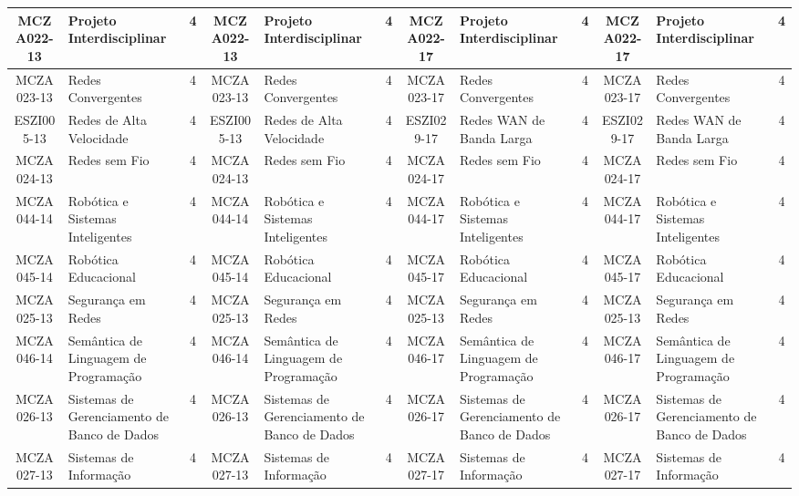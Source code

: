 \documentclass[a4paper]{article}
\begin{document}
\begin{landscape}
{\begin{longtable}{|c|p{.2\textheight}|c||c|p{.2\textheight}|c||c|p{.2\textheight}|c||c|p{.2\textheight}|c|}
MCZA022-13 & Projeto Interdisciplinar & 4 &
MCZA022-13 & Projeto Interdisciplinar & 4 &
MCZA022-17 & Projeto Interdisciplinar & 4 & 
MCZA022-17 & Projeto Interdisciplinar & 4\\ \hline

MCZA023-13 & Redes Convergentes & 4 &
MCZA023-13 & Redes Convergentes & 4 &
MCZA023-17 & Redes Convergentes & 4 &
MCZA023-17 & Redes Convergentes & 4\\ \hline

ESZI005-13 & Redes de Alta Velocidade & 4 &
ESZI005-13 & Redes de Alta Velocidade & 4 &
ESZI029-17 & Redes WAN de Banda Larga & 4 &
ESZI029-17 & Redes WAN de Banda Larga & 4\\ \hline

MCZA024-13 & Redes sem Fio & 4 &
MCZA024-13 & Redes sem Fio & 4 &
MCZA024-17 & Redes sem Fio & 4 &
MCZA024-17 & Redes sem Fio & 4\\ \hline

MCZA044-14 & Robótica e Sistemas Inteligentes & 4 &
MCZA044-14 & Robótica e Sistemas Inteligentes & 4 &
MCZA044-17 & Robótica e Sistemas Inteligentes & 4 &
MCZA044-17 & Robótica e Sistemas Inteligentes & 4\\ \hline

MCZA045-14 & Robótica Educacional & 4 &
MCZA045-14 & Robótica Educacional & 4 &
MCZA045-17 & Robótica Educacional & 4 &
MCZA045-17 & Robótica Educacional & 4\\ \hline

MCZA025-13 & Segurança em Redes & 4 &
MCZA025-13 & Segurança em Redes & 4 &
MCZA025-13 & Segurança em Redes & 4 & 
MCZA025-13 & Segurança em Redes & 4\\ \hline

MCZA046-14 & Semântica de Linguagem de Programação & 4 &
MCZA046-14 & Semântica de Linguagem de Programação & 4 &
MCZA046-17 & Semântica de Linguagem de Programação & 4 &
MCZA046-17 & Semântica de Linguagem de Programação & 4\\ \hline

MCZA026-13 & Sistemas de Gerenciamento de Banco de Dados & 4 &
MCZA026-13 & Sistemas de Gerenciamento de Banco de Dados & 4 &
MCZA026-17 & Sistemas de Gerenciamento de Banco de Dados & 4 & 
MCZA026-17 & Sistemas de Gerenciamento de Banco de Dados & 4\\ \hline

MCZA027-13 & Sistemas de Informação & 4 &
MCZA027-13 & Sistemas de Informação & 4 &
MCZA027-17 & Sistemas de Informação & 4 &
MCZA027-17 & Sistemas de Informação & 4\\ \hline


\end{longtable}}
\end{landscape}
\end{document}
